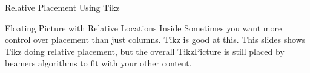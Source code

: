 \documentclass[aspectratio=169]{beamer}
\begin{document}
\begin{frame}{Relative Placement Using Tikz}

  \begin{block}{Floating Picture with Relative Locations Inside}
  Sometimes you want more control over placement than just columns.
  Tikz is good at this.
  This slides shows Tikz doing relative placement, but the overall TikzPicture is still placed by beamers algorithms to fit with your other content.
  \end{block}

\end{frame}
\end{document}
